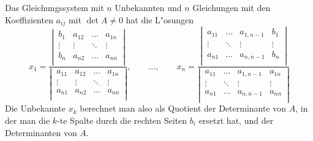\begin{satz}[Cramer]
Das Gleichungssystem mit $n$ Unbekannten und $n$ Gleichungen
mit den Koeffizienten $a_{ij}$ 
mit $\det A\ne 0$ hat die L"osungen
\[
x_1=\frac{
\left|\,\begin{matrix}
b_1&a_{12}&\dots&a_{1n}\\
\vdots&\vdots&\ddots&\vdots\\
b_n&a_{n2}&\dots&a_{nn}\\
\end{matrix}\,\right|
}{
\left|\,\begin{matrix}
a_{11}&a_{12}&\dots&a_{1n}\\
\vdots&\vdots&\ddots&\vdots\\
a_{n1}&a_{n2}&\dots&a_{nn}\\
\end{matrix}\,\right|
}
,\qquad\dots,\qquad
x_n=\frac{
\left|\,\begin{matrix}
a_{11}&\dots&a_{1,n-1}&b_1\\
\vdots&\ddots&\vdots&\vdots\\
a_{n1}&\dots&a_{n,n-1}&b_n\\
\end{matrix}\,\right|
}{
\left|\,\begin{matrix}
a_{11}&\dots&a_{1,n-1}&a_{1n}\\
\vdots&\ddots&\vdots&\vdots\\
a_{n1}&\dots&a_{n,n-1}&a_{nn}\\
\end{matrix}\,\right|
}
\]
Die Unbekannte $x_k$ berechnet man also als Quotient der Determinante
von $A$, in der man die $k$-te Spalte durch die rechten Seiten $b_i$
ersetzt hat, und der Determinanten von $A$.
\end{satz}
